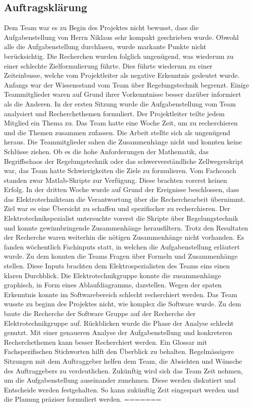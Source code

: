 \subsection{Auftragsklärung}
Dem Team war es zu Begin des Projektes nicht bewusst, dass die Aufgabenstellung von Herrn Niklaus sehr kompakt geschrieben wurde. Obwohl alle die Aufgabenstellung durchlasen, wurde markante Punkte nicht berücksichtig. Die Recherchen wurden folglich ungenügend, was wiederum zu einer schlechte Zielformulierung führte. Dies führte wiederum zu einer Zeiteinbusse, welche vom Projektleiter als negative Erkenntnis gedeutet wurde. 
Anfangs war der Wissensstand vom Team über Regelungstechnik begrenzt. Einige Teammitglieder waren auf Grund ihrer Vorkenntnisse besser darüber informiert als die Anderen. In der ersten Sitzung wurde die Aufgabenstellung vom Team analysiert und Recherchethemen formuliert. Der Projektleiter teilte jedem Mitglied ein Thema zu. Das Team hatte eine Woche Zeit, um zu recherchieren und die Themen zusammen zufassen. Die Arbeit stellte sich als ungenügend heraus. Die Teammitglieder sahen die Zusammenhänge nicht und konnten keine Schlüsse ziehen. Ob es die hohe Anforderungen der Mathematik, das Begriffschaos der Regelungstechnik oder das schwerverständliche Zellwegerskript war, das Team hatte Schwierigkeiten die Ziele zu formulieren. Vom Fachcoach standen zwar Matlab-Skripte zur Verfügung. Diese brachten vorerst keinen Erfolg. In der dritten Woche wurde auf Grund der Ereignisse beschlossen, dass das Elektrotechnikteam die Verantwortung über die Recherchearbeit übernimmt. Ziel war es eine Übersicht zu schaffen und spezifischer zu recherchieren. Der Elektrotechnikspezialist untersuchte vorerst die Skripte über Regelungstechnik und konnte gewinnbringende Zusammenhänge herausfiltern. Trotz den Resultaten der Recherche waren weiterhin die nötigen Zusammenhänge nicht vorhanden. Es fanden wöchentlich Fachinputs statt, in welchen die Aufgabenstellung erläutert wurde. Zu dem konnten die Teams Fragen über Formeln und Zusammenhänge stellen. Diese Inputs brachten dem Elektrospezialisten des Teams eins einen klaren Durchblick. Die Elektrotechnikgruppe konnte die zusammenhänge graphisch, in Form eines Ablaufdiagramms, darstellen. Wegen der spaten Erkenntnis konnte im Softwarebereich schlecht recherchiert werden. Das Team wusste zu beginn des Projektes nicht, wie komplex die Software wurde. Zu dem baute die Recherche der Software Gruppe auf der Recherche der Elektrotechnikgruppe auf. 
Rückblicken wurde die Phase der Analyse schlecht genutzt. Mit einer genaueren Analyse der Aufgabenstellung und konkreteren Recherchethemen kann besser Recherchiert werden. Ein Glossar mit Fachspezifischen Stichworten hilft den Überblick zu behalten. Regelmässigere Sitzungen mit dem Auftraggeber helfen dem Team, die Absichten und Wünsche des Auftraggebers zu verdeutlichen.
Zukünftig wird sich das Team Zeit nehmen, um die Aufgabenstellung auseinander zunehmen. Diese werden diskutiert und Entscheide werden festgehalten. So kann zukünftig Zeit eingespart werden und die Planung präziser formuliert werden.
=======
